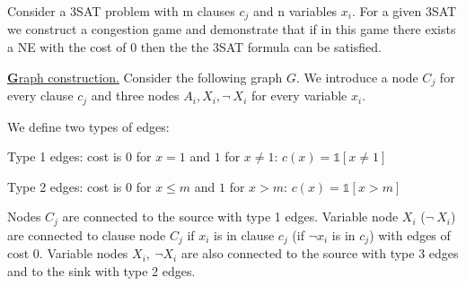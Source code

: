 Consider a 3SAT problem with m clauses $c_j$ and n variables $x_i$. For a given 3SAT we construct a congestion game and demonstrate that if in this game there exists a NE with the cost of 0 then the the 3SAT formula can be satisfied.
\bigskip

\uline{\textbf Graph construction.} Consider the following graph $G$. We introduce a node $C_j$ for every clause $c_j$ and three nodes $A_i,X_i,\neg\ X_i$ for every variable $x_i$.

We define two types of edges:

Type 1 edges: cost is 0 for $x=1$ and $1$ for $x\neq 1$: $c(x) = \mathbb 1[x\neq 1]$

Type 2 edges: cost is 0 for $x\leq m$ and $1$ for $x>m$: $c(x) = \mathbb 1 [x>m]$

Nodes $C_j$ are connected to the source with type 1 edges. Variable node $X_i$ ($\neg\ X_i$) are connected to clause node $C_j$ if $x_i$ is in clause $c_j$ (if $\neg x_i$ is in $c_j$) with edges of cost 0.  Variable nodes $X_i,\ \neg X_i$ are also connected to the source with type 3 edges and to the sink with type 2 edges.

